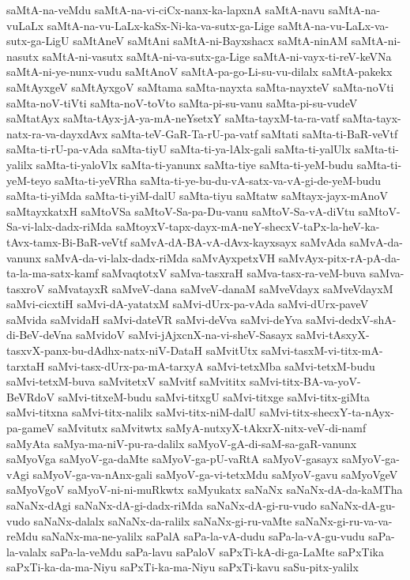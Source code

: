 {saMtA-na-veMdu
saMtA-na-vi-ciCx-nanx-ka-lapxnA
saMtA-navu
saMtA-na-vuLaLx
saMtA-na-vu-LaLx-kaSx-Ni-ka-va-sutx-ga-Lige
saMtA-na-vu-LaLx-va-sutx-ga-LigU
saMtAneV
saMtAni
saMtA-ni-Bayxshacx
saMtA-ninAM
saMtA-ni-nasutx
saMtA-ni-vasutx
saMtA-ni-va-sutx-ga-Lige
saMtA-ni-vayx-ti-reV-keVNa
saMtA-ni-ye-nunx-vudu
saMtAnoV
saMtA-pa-go-Li-su-vu-dilalx
saMtA-pakekx
saMtAyxgeV
saMtAyxgoV
saMtama
saMta-nayxta
saMta-nayxteV
saMta-noVti
saMta-noV-tiVti
saMta-noV-toVto
saMta-pi-su-vanu
saMta-pi-su-vudeV
saMtatAyx
saMta-tAyx-jA-ya-mA-neYsetxY
saMta-tayxM-ta-ra-vatf
saMta-tayx-natx-ra-va-dayxdAvx
saMta-teV-GaR-Ta-rU-pa-vatf
saMtati
saMta-ti-BaR-veVtf
saMta-ti-rU-pa-vAda
saMta-tiyU
saMta-ti-ya-lAlx-gali
saMta-ti-yalUlx
saMta-ti-yalilx
saMta-ti-yaloVlx
saMta-ti-yanunx
saMta-tiye
saMta-ti-yeM-budu
saMta-ti-yeM-teyo
saMta-ti-yeVRha
saMta-ti-ye-bu-du-vA-satx-va-vA-gi-de-yeM-budu
saMta-ti-yiMda
saMta-ti-yiM-dalU
saMta-tiyu
saMtatw
saMtayx-jayx-mAnoV
saMtayxkatxH
saMtoVSa
saMtoV-Sa-pa-Du-vanu
saMtoV-Sa-vA-diVtu
saMtoV-Sa-vi-lalx-dadx-riMda
saMtoyxV-tapx-dayx-mA-neY-shecxV-taPx-la-heV-ka-tAvx-tamx-Bi-BaR-veVtf
saMvA-dA-BA-vA-dAvx-kayxsayx
saMvAda
saMvA-da-vanunx
saMvA-da-vi-lalx-dadx-riMda
saMvAyxpetxVH
saMvAyx-pitx-rA-pA-da-ta-la-ma-satx-kamf
saMvaqtotxV
saMva-tasxraH
saMva-tasx-ra-veM-buva
saMva-tasxroV
saMvatayxR
saMveV-dana
saMveV-danaM
saMveVdayx
saMveVdayxM
saMvi-cicxtiH
saMvi-dA-yatatxM
saMvi-dUrx-pa-vAda
saMvi-dUrx-paveV
saMvida
saMvidaH
saMvi-dateVR
saMvi-deVva
saMvi-deYva
saMvi-dedxV-shA-di-BeV-deVna
saMvidoV
saMvi-jAjxcnX-na-vi-sheV-Sasayx
saMvi-tAsxyX-tasxvX-panx-bu-dAdhx-natx-niV-DataH
saMvitUtx
saMvi-tasxM-vi-titx-mA-tarxtaH
saMvi-tasx-dUrx-pa-mA-tarxyA
saMvi-tetxMba
saMvi-tetxM-budu
saMvi-tetxM-buva
saMvitetxV
saMvitf
saMvititx
saMvi-titx-BA-va-yoV-BeVRdoV
saMvi-titxeM-budu
saMvi-titxgU
saMvi-titxge
saMvi-titx-giMta
saMvi-titxna
saMvi-titx-nalilx
saMvi-titx-niM-dalU
saMvi-titx-shecxY-ta-nAyx-pa-gameV
saMvitutx
saMvitwtx
saMyA-nutxyX-tAkxrX-nitx-veV-di-namf
saMyAta
saMya-ma-niV-pu-ra-dalilx
saMyoV-gA-di-saM-sa-gaR-vanunx
saMyoVga
saMyoV-ga-daMte
saMyoV-ga-pU-vaRtA
saMyoV-gasayx
saMyoV-ga-vAgi
saMyoV-ga-va-nAnx-gali
saMyoV-ga-vi-tetxMdu
saMyoV-gavu
saMyoVgeV
saMyoVgoV
saMyoV-ni-ni-muRkwtx
saMyukatx
saNaNx
saNaNx-dA-da-kaMTha
saNaNx-dAgi
saNaNx-dA-gi-dadx-riMda
saNaNx-dA-gi-ru-vudo
saNaNx-dA-gu-vudo
saNaNx-dalalx
saNaNx-da-ralilx
saNaNx-gi-ru-vaMte
saNaNx-gi-ru-va-va-reMdu
saNaNx-ma-ne-yalilx
saPalA
saPa-la-vA-dudu
saPa-la-vA-gu-vudu
saPa-la-valalx
saPa-la-veMdu
saPa-lavu
saPaloV
saPxTi-kA-di-ga-LaMte
saPxTika
saPxTi-ka-da-ma-Niyu
saPxTi-ka-ma-Niyu
saPxTi-kavu
saSu-pitx-yalilx
}
